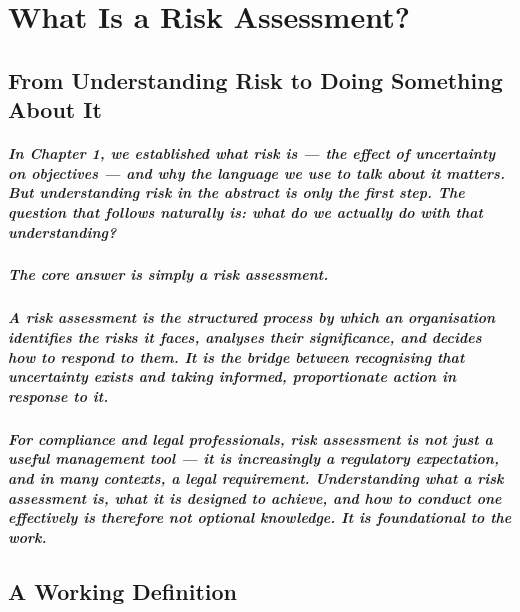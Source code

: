 \chapter{What Is a Risk Assessment?}
\label{chap:What Is a Risk Assessment}

\section{From Understanding Risk to Doing Something About It}
\paragraph{In Chapter 1, we established what risk is — the effect of uncertainty on objectives — and why the language we use to talk about it matters. But understanding risk in the abstract is only the first step. The question that follows naturally is: \textit{what do we actually do with that understanding?}}

\paragraph{The core answer is simply \textbf{\textit{a risk assessment}}.}

\paragraph{A risk assessment is the structured process by which an organisation identifies the risks it faces, analyses their significance, and decides how to respond to them. It is the bridge between recognising that uncertainty exists and taking informed, proportionate action in response to it.}

\paragraph{For compliance and legal professionals, risk assessment is not just a useful management tool — it is increasingly a regulatory expectation, and in many contexts, a legal requirement. Understanding what a risk assessment is, what it is designed to achieve, and how to conduct one effectively is therefore not optional knowledge. It is foundational to the work.}

\section{A Working Definition}

